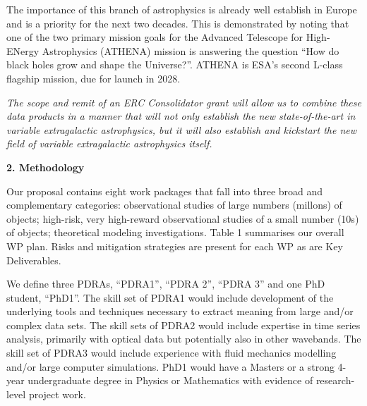 \documentclass[oneside, a4paper, onecolumn, 11pt]{article}
\begin{document}
\smallskip
\smallskip
\noindent
The importance of this branch of astrophysics is already well
establish in Europe and is a priority for the next two decades. This
is demonstrated by noting that one of the two primary mission goals
for the Advanced Telescope for High-ENergy Astrophysics (ATHENA) mission 
is answering the question ``How do black holes grow and shape the
Universe?''.  ATHENA is ESA's second L-class flagship mission, due for
launch in 2028.

\smallskip
\smallskip
\noindent
{\it The scope and remit of an ERC Consolidator grant will allow us to
combine these data products in a manner that will not only establish
the new state-of-the-art in variable extragalactic astrophysics, but it 
will also establish and kickstart the new field of variable extragalactic
astrophysics itself.}




\medskip
\medskip
\noindent
\large
{\bf{\textcolor{Cerulean}{2. Methodology}}}
\normalsize

\noindent
Our proposal contains eight work packages that fall into three broad
and complementary categories: observational studies of large numbers
(millons) of objects; high-risk, very high-reward observational
studies of a small number (10s) of objects; theoretical modeling
investigations. Table 1 summarises our overall WP plan. Risks and
mitigation strategies are present for each WP as are Key Deliverables.

\smallskip
\smallskip
\noindent
We define three PDRAs, ``PDRA1'', ``PDRA 2'', ``PDRA 3'' and one PhD
student, ``PhD1''.  The skill set of PDRA1 would include development
of the underlying tools and techniques necessary to extract meaning
from large and/or complex data sets.  The skill sets of PDRA2 would
include expertise in time series analysis, primarily with optical
data but potentially also in other wavebands.  The skill set of PDRA3
would include experience with fluid mechanics modelling and/or large
computer simulations.  PhD1 would have a Masters or a strong 4-year
undergraduate degree in Physics or Mathematics with evidence of
research-level project work.
\end{document}
